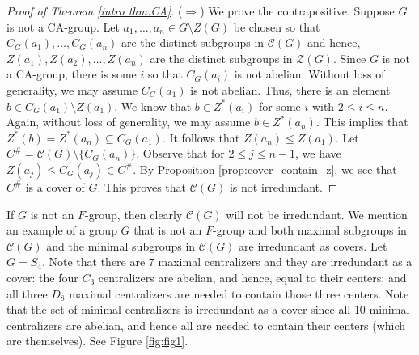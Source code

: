 \documentclass[12pt]{amsart}
\begin{document}
{\begin{proof} [Proof of Theorem \ref{intro thm:CA}]
($\Rightarrow$) We prove the contrapositive.  Suppose $G$ is not a CA-group.  Let $a_1, \dots, a_n \in G \setminus Z(G)$ be chosen so that $C_G(a_1), \dots, C_G (a_n)$ are the distinct subgroups in $\mathcal {C}  (G)$ and hence, $Z(a_1), Z(a_2), \dots, Z (a_n)$ are the distinct subgroups in $\mathcal {Z} (G)$.  Since $G$ is not a CA-group, there is some $i$ so that $C_G (a_i)$ is not abelian.  Without loss of generality, we may assume $C_G (a_1)$ is not abelian.  Thus, there is an element $b \in C_G(a_1) \setminus Z(a_1)$.  We know that $b \in Z^* (a_i)$ for some $i$ with $2 \le i \le n$.  Again, without loss of generality, we may assume $b \in Z^* (a_n)$.  This implies that $Z^* (b) = Z^* (a_n) \subseteq C_G (a_1)$.  It follows that $Z (a_n) \le Z(a_1)$.  Let $C^\# = \mathcal {C} (G) \setminus \{ C_G (a_n) \}$.   Observe that for $2 \le j \le n-1$, we have $Z (a_j) \le C_G (a_j) \in C^\#$.  By Proposition \ref{prop:cover_contain_z}, we see that $C^\#$ is a cover of $G$.  This proves that $\mathcal {C} (G)$ is not irredundant. 
\end{proof}

If $G$ is not an $F$-group, then clearly $\mathcal {C}(G)$ will not be irredundant.   We mention an example of a group $G$ that is not an $F$-group and both maximal subgroups in $\mathcal {C} (G)$ and the minimal subgroups in $\mathcal {C} (G)$ are irredundant as covers.  Let $G = S_4$.  Note that there are $7$ maximal centralizers and they are irredundant as a cover: the four $C_3$ centralizers are abelian, and hence, equal to their centers; and all three $D_8$ maximal centralizers are needed to contain those three centers.  Note that the set of minimal centralizers is irredundant as a cover since all $10$ minimal centralizers are abelian, and hence all are needed to contain their centers (which are themselves).  See Figure \ref{fig:fig1}.  

}
\end{document}
